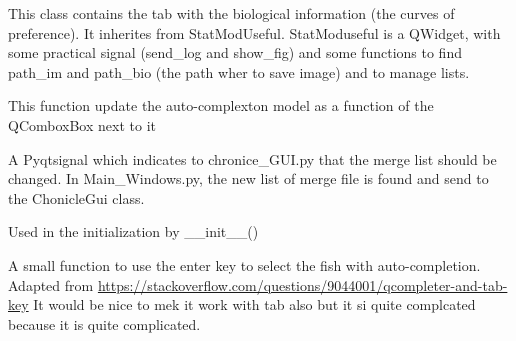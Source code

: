 \documentclass[letterpaper,10pt,english]{sphinxmanual}
\begin{document}
\begin{fulllineitems}
\label{\detokenize{index:src_GUI.bio_info_GUI.BioInfo}}
This class contains the tab with the biological information (the curves of preference). It inherites from
StatModUseful. StatModuseful is a QWidget, with some practical signal (send\_log and show\_fig) and some functions
to find path\_im and path\_bio (the path wher to save image) and to manage lists.

\begin{fulllineitems}
\label{\detokenize{index:src_GUI.bio_info_GUI.BioInfo.get_autocompletion}}
This function update the auto-complexton model as a function of the QComboxBox next to it

\end{fulllineitems}


\begin{fulllineitems}
\label{\detokenize{index:src_GUI.bio_info_GUI.BioInfo.get_list_merge}}
A Pyqtsignal which indicates to chronice\_GUI.py that the merge list should be changed. In Main\_Windows.py,
the new list of merge file is found and send to the ChonicleGui class.

\end{fulllineitems}


\begin{fulllineitems}
\label{\detokenize{index:src_GUI.bio_info_GUI.BioInfo.init_iu}}
Used in the initialization by \_\_init\_\_()

\end{fulllineitems}


\begin{fulllineitems}
\label{\detokenize{index:src_GUI.bio_info_GUI.BioInfo.next_completion}}
A small function to use the enter key to select the fish with auto-completion.
Adapted from \url{https://stackoverflow.com/questions/9044001/qcompleter-and-tab-key}
It would be nice to mek it work with tab also but it si quite complcated because it is quite complicated.


\end{fulllineitems}
\end{fulllineitems}
\end{document}
